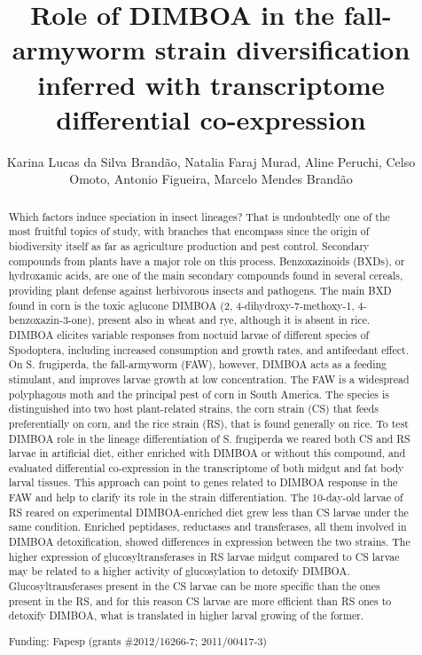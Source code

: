\documentclass[twoside]{article}
\title{\vspace{-15mm}\fontsize{24pt}{10pt}\selectfont\textbf{ Role of DIMBOA in the fall-armyworm strain diversification inferred with transcriptome differential co-expression }} %
\author{ Karina Lucas da Silva Brand\~ao, Natalia Faraj Murad, Aline Peruchi, Celso Omoto, Antonio Figueira, Marcelo Mendes Brand\~ao }
\affil{ Unicamp }
\date{}
\begin{document}
  
  
  \maketitle %
  
  
  \thispagestyle{fancy} %
  
  
  \begin{abstract}
  Which factors induce speciation in insect lineages? That is undoubtedly one of the most fruitful topics of study,  with branches that encompass since the origin of biodiversity itself as far as agriculture production and pest control. Secondary compounds from plants have a major role on this process. Benzoxazinoids (BXDs),  or hydroxamic acids,  are one of the main secondary compounds found in several cereals,  providing plant defense against herbivorous insects and pathogens. The main BXD found in corn is the toxic aglucone DIMBOA (2, 4-dihydroxy-7-methoxy-1, 4-benzoxazin-3-one),  present also in wheat and rye,  although it is absent in rice. DIMBOA elicites variable responses from noctuid larvae of different species of Spodoptera,  including increased consumption and growth rates,  and antifeedant effect. On S. frugiperda,  the fall-armyworm (FAW),  however,  DIMBOA acts as a feeding stimulant,  and improves larvae growth at low concentration. The FAW is a widespread polyphagous moth and the principal pest of corn in South America. The species is distinguished into two host plant-related strains,  the corn strain (CS) that feeds preferentially on corn,  and the rice strain (RS),  that is found generally on rice. To test DIMBOA role in the lineage differentiation of S. frugiperda we reared both CS and RS larvae in artificial diet,  either enriched with DIMBOA or without this compound,  and evaluated differential co-expression in the transcriptome of both midgut and fat body larval tissues. This approach can point to genes related to DIMBOA response in the FAW and help to clarify its role in the strain differentiation. The 10-day-old larvae of RS reared on experimental DIMBOA-enriched diet grew less than CS larvae under the same condition. Enriched peptidases,  reductases and transferases,  all them involved in DIMBOA detoxification,  showed differences in expression between the two strains. The higher expression of glucosyltransferases in RS larvae midgut compared to CS larvae may be related to a higher activity of glucosylation to detoxify DIMBOA. Glucosyltransferases present in the CS larvae can be more specific than the ones present in the RS,  and for this reason CS larvae are more efficient than RS ones to detoxify DIMBOA,  what is translated in higher larval growing of the former.
  
  Funding: Fapesp (grants \#2012/16266-7; 2011/00417-3) \\ 
  \end{abstract}
  
\end{document}
